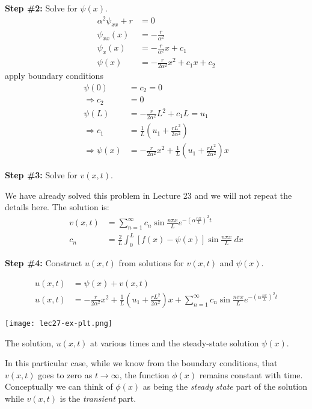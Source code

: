 \vspace{0.25cm}

\noindent\textbf{Step \#2:}  Solve for $\psi(x)$.
\begin{align*}
\alpha^2\psi_{xx}+r &= 0 \\
\psi_{xx}(x) &= -\frac{r}{\alpha^2} \\
\psi_{x}(x) &= -\frac{r}{\alpha^2}x + c_1 \\
\psi(x) &= -\frac{r}{2\alpha^2}x^2+c_1x + c_2
\end{align*}
apply boundary conditions
\begin{align*}
\psi(0) &= c_2 = 0 \\
\Rightarrow c_2 &= 0 \\
\psi(L) &= -\frac{r}{2\alpha^2}L^2 + c_1 L = u_1 \\
\Rightarrow c_1 &= \frac{1}{L}\left(u_1+\frac{rL^2}{2 \alpha^2}\right) \\
\Rightarrow \psi(x) &= -\frac{r}{2\alpha^2}x^2 + \frac{1}{L}\left(u_1+\frac{rL^2}{2 \alpha^2}\right)x
\end{align*}

\vspace{0.25cm}

\noindent\textbf{Step \#3:} Solve for $v(x,t)$.

\vspace{0.25cm}

\noindent We have already solved this problem in Lecture 23 and we will not repeat the details here.  The solution is:
\begin{align*}
v(x,t) &= \sum\limits_{n=1}^{\infty} c_n \sin{\frac{n \pi x}{L}}e^{-\left(\alpha \frac{n \pi}{L}\right)^2 t} \\
c_n &= \frac{2}{L} \int_0^L \left[f(x)-\psi(x)\right]\sin{\frac{n \pi x}{L}} \ dx
\end{align*}

\vspace{0.25cm}

\noindent\textbf{Step \#4:} Construct $u(x,t)$ from solutions for $v(x,t)$ and $\psi(x)$.

\begin{align*}
u(x,t) &= \psi(x) + v(x,t) \\
u(x,t) &= -\frac{r}{2\alpha^2}x^2 + \frac{1}{L}\left(u_1+\frac{rL^2}{2 \alpha^2}\right)x + \sum\limits_{n=1}^{\infty} c_n \sin{\frac{n \pi x}{L}}e^{-\left(\alpha \frac{n \pi}{L}\right)^2 t}
\end{align*}
\begin{marginfigure}
\texttt{[image: lec27-ex-plt.png]}
\caption{The solution, $u(x,t)$ at various times and the steady-state solution $\psi(x)$.}
\label{fig:lec27-ex-plt}
\end{marginfigure}
In this particular case, while we know from the boundary conditions, that $v(x,t)$ goes to zero as $t \rightarrow \infty$, the function $\phi(x)$ remains constant with time.  Conceptually we can think of $\phi(x)$ as being the \emph{steady state} part of the solution while $v(x,t)$ is the \emph{transient} part.

